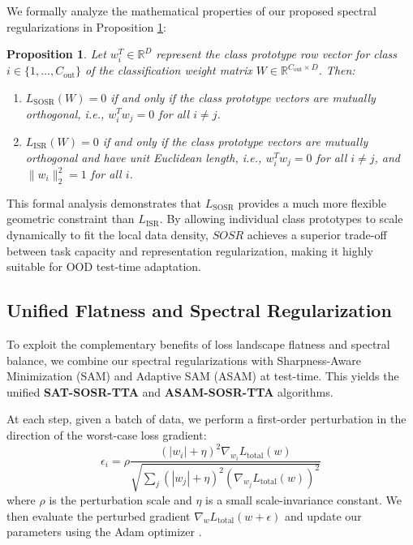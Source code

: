 \documentclass{article}
\theoremstyle{plain}
\newtheorem{proposition}[theorem]{Proposition}
\theoremstyle{definition}
\theoremstyle{remark}
\begin{document}
We formally analyze the mathematical properties of our proposed spectral regularizations in Proposition \ref{prop:ortho}:
\begin{proposition}
\label{prop:ortho}
Let $w_i^T \in \mathbb{R}^{D}$ represent the class prototype row vector for class $i \in \{1, \dots, C_{\text{out}}\}$ of the classification weight matrix $W \in \mathbb{R}^{C_{\text{out}} \times D}$. 
Then:
\begin{enumerate}
  \item $L_{\text{SOSR}}(W) = 0$ if and only if the class prototype vectors are mutually orthogonal, i.e., $w_i^T w_j = 0$ for all $i \neq j$.
  \item $L_{\text{ISR}}(W) = 0$ if and only if the class prototype vectors are mutually orthogonal and have unit Euclidean length, i.e., $w_i^T w_j = 0$ for all $i \neq j$, and $\|w_i\|_2^2 = 1$ for all $i$.
\end{enumerate}
\end{proposition}

This formal analysis demonstrates that $L_{\text{SOSR}}$ provides a much more flexible geometric constraint than $L_{\text{ISR}}$. By allowing individual class prototypes to scale dynamically to fit the local data density, $SOSR$ achieves a superior trade-off between task capacity and representation regularization, making it highly suitable for OOD test-time adaptation.

\subsection{Unified Flatness and Spectral Regularization}
\label{subsec:unified}
To exploit the complementary benefits of loss landscape flatness and spectral balance, we combine our spectral regularizations with Sharpness-Aware Minimization (SAM) \cite{foret2021sharpness} and Adaptive SAM (ASAM) \cite{kwon2021asam} at test-time. This yields the unified \textbf{SAT-SOSR-TTA} and \textbf{ASAM-SOSR-TTA} algorithms. 

At each step, given a batch of data, we perform a first-order perturbation in the direction of the worst-case loss gradient:
\begin{equation}
  \epsilon_i = \rho \frac{(|w_i| + \eta)^2 \nabla_{w_i} L_{\text{total}}(w)}{\sqrt{\sum_j (|w_j| + \eta)^2 (\nabla_{w_j} L_{\text{total}}(w))^2}}
\end{equation}
where $\rho$ is the perturbation scale and $\eta$ is a small scale-invariance constant. We then evaluate the perturbed gradient $\nabla_w L_{\text{total}}(w + \epsilon)$ and update our parameters using the Adam optimizer \cite{kingma2015adam,paszke2019pytorch}.
\end{document}
